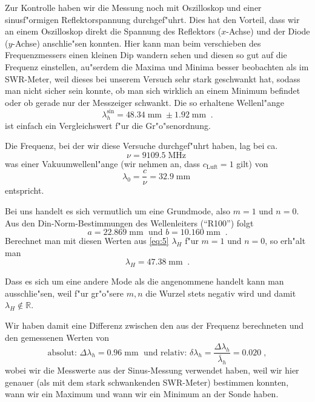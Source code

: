 \documentclass[a4paper,12pt]{article}
\begin{document}
Zur Kontrolle haben wir die Messung noch mit Oszilloskop und einer
sinusf"ormigen Reflektorspannung durchgef"uhrt. Dies hat den Vorteil,
dass wir an einem Oszilloskop direkt die Spannung des Reflektors
($x$-Achse) und der Diode ($y$-Achse) anschlie"sen konnten. Hier kann
man beim verschieben des Frequenzmessers einen kleinen Dip wandern
sehen und diesen so gut auf die Frequenz einstellen, au"serdem die
Maxima und Minima besser beobachten als im SWR-Meter, weil dieses bei
unserem Versuch sehr stark geschwankt hat, sodass man nicht sicher
sein konnte, ob man sich wirklich an einem Minimum befindet oder ob
gerade nur der Messzeiger schwankt. Die so erhaltene Wellenl"ange
\begin{equation}
  \label{eq:2}
  \lambda_h^{\sin} = 48.34\operatorname{mm} \pm
  1.92\operatorname{mm} \;.
\end{equation}
ist einfach ein Vergleichswert f"ur die Gr"o"senordnung.


Die Frequenz, bei der wir diese Versuche durchgef"uhrt haben, lag bei
ca.
\begin{equation*}
  \nu = 9109.5 \operatorname{MHz}
\end{equation*}
was einer Vakuumwellenl"ange (wir nehmen an, dass $c_\text{Luft} = 1$
gilt) von
\begin{equation*}
  \lambda_0 = \frac c \nu = 32.9 \operatorname{mm}
\end{equation*}
entspricht.



Bei uns handelt es sich vermutlich um eine Grundmode, also $m=1$ und
$n=0$. Aus den Din-Norm-Bestimmungen des Wellenleiters ("`R100"')
folgt
\begin{equation*}
  a = 22.869 \operatorname{mm} \text{ und } b =
  10.160\operatorname{mm} \;.
\end{equation*}
Berechnet man mit diesen Werten aus \eqref{eq:5} $\lambda_H$ f"ur
$m=1$ und $n=0$, so erh"alt man
\begin{equation*}
  \lambda_H = 47.38\operatorname{mm} \;.
\end{equation*}

Dass es sich um eine andere Mode als die angenommene handelt kann man
ausschlie"sen, weil f"ur gr"o"sere $m,n$ die Wurzel stets negativ wird
und damit $\lambda_H \notin \mathbb R$.

Wir haben damit eine Differenz zwischen den aus der Frequenz
berechneten und den gemessenen Werten von
\begin{equation*}
  \text{absolut: } \Delta \lambda_h = 0.96\operatorname{mm} \text{ und
    relativ: } \delta \lambda_h = \frac{ \Delta \lambda_h }{ \bar
    \lambda_h } = 0.020 \;,
\end{equation*}
wobei wir die Messwerte aus der Sinus-Messung verwendet haben, 
weil wir hier genauer (als mit dem stark schwankenden SWR-Meter)
bestimmen konnten, wann wir ein Maximum und wann wir ein Minimum an
der Sonde haben.
\end{document}
